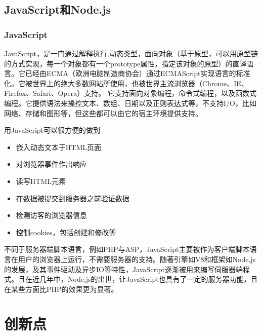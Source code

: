 \documentclass[11pt]{ctexart}
\begin{document}
\subsection{JavaScript和Node.js}
\subsubsection{JavaScript}
JavaScript，是一门通过解释执行,动态类型，面向对象（基于原型，可以用原型链的方式实现，每一个对象都有一个prototype属性，指定该对象的原型）的直译语言。它已经由ECMA（欧洲电脑制造商协会）通过ECMAScript实现语言的标准化。它被世界上的绝大多数网站所使用，也被世界主流浏览器（Chrome、IE、Firefox、Safari、Opera）支持。
它支持面向对象编程，命令式编程，以及函数式编程。它提供语法来操控文本、数组、日期以及正则表达式等，不支持I/O，比如网络、存储和图形等，但这些都可以由它的宿主环境提供支持。

用JavaScript可以很方便的做到
\begin{itemize}
	\item 嵌入动态文本于HTML页面
	\item 对浏览器事件作出响应
	\item 读写HTML元素
	\item 在数据被提交到服务器之前验证数据
	\item 检测访客的浏览器信息
	\item 控制cookies，包括创建和修改等
\end{itemize}

不同于服务器端脚本语言，例如PHP与ASP，JavaScript主要被作为客户端脚本语言在用户的浏览器上运行，不需要服务器的支持。随著引擎如V8和框架如Node.js的发展，及其事件驱动及异步IO等特性，JavaScript逐渐被用来编写伺服器端程式。且在近几年中，Node.js的出世，让JavaScript也具有了一定的服务器功能，且在某些方面比PHP的效果更为显著。

\section{创新点}

\nocite{*}


\end{document}
